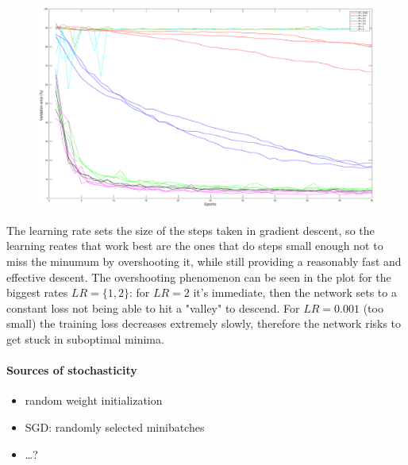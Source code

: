 \documentclass{article}
\begin{document}
    \begin{figure}[!htb]
        \centering
        \includegraphics[width=\textwidth]{figures/sc1_val_err}
    \end{figure}
    
    The learning rate sets the size of the steps taken in gradient descent, so the learning reates that work best are the ones that do steps small enough not to miss the minumum by overshooting it,
    while still providing a reasonably fast and effective descent. The overshooting phenomenon can be seen in the plot for the biggest rates $LR = \{1,2\}$: for $LR = 2$ it's immediate, then the network sets to a constant loss 
    not being able to hit a "valley" to descend.
    For $LR = 0.001$ (too small) the training loss decreases extremely slowly, therefore the network risks to get stuck in suboptimal minima.
    
    \paragraph*{Sources of stochasticity}
        \begin{itemize}
        \item random weight initialization
        \item SGD: randomly selected minibatches
        \item \dots?
        \end{itemize}
    
    
    
    
\end{document}
